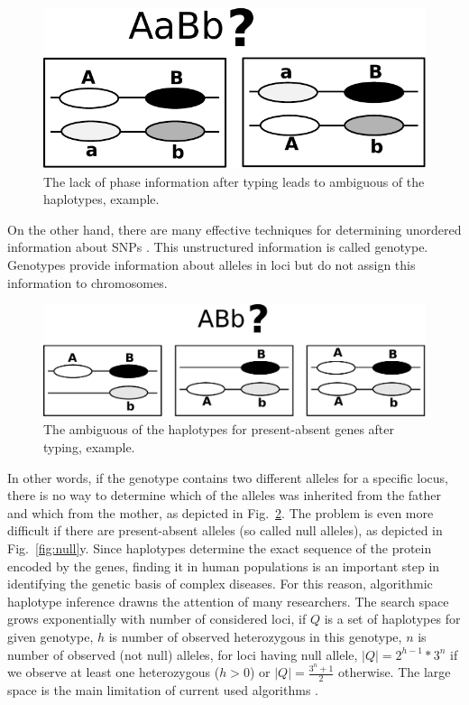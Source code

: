 \documentclass[]{spie}
\begin{document}
\begin{figure}[!htb]
\centering
\includegraphics[scale=0.6]{images/poli}
\caption{The lack of phase information after typing leads to ambiguous of the haplotypes, example.}
\label{fig:poli}
\end{figure}

On the other hand, there are many effective techniques for determining unordered information about SNPs \cite{hapmap}.
This unstructured information is called genotype.
Genotypes provide information about alleles in loci but do not assign this information to chromosomes.

\begin{figure}[!htb]
\centering
\includegraphics[scale=0.6]{images/null}
\caption{The ambiguous of the haplotypes for present-absent genes after typing, example.}
\label{fig:poli}
\end{figure}



In other words, if the genotype contains two different alleles for a specific locus,
there is no way to determine which of the alleles was inherited from the father and which from the mother, as depicted in Fig.~\ref{fig:poli}.
The problem is even more difficult if there are present-absent alleles (so called null alleles), as depicted in Fig.~\ref{fig:null}y.
Since haplotypes determine the exact sequence of the protein encoded by the genes,
finding it in human populations is an important step in identifying the genetic basis of complex diseases.
For this reason, algorithmic haplotype inference drawns the attention of many researchers.
The search space grows exponentially with number of considered loci,
if $Q$ is a set of haplotypes for given genotype, $h$ is number of observed heterozygous in this genotype, $n$ is number of observed (not null) alleles,
for loci having null allele,
$|Q| = 2^{h - 1}*3^{n}$ if we observe at least one heterozygous ($h > 0$) or $|Q|=\frac{3^{n}+1}{2}$ otherwise.
The large space is the main limitation of current used algorithms \cite{arlequin, phase, haploihp, nowak}.
\end{document}
